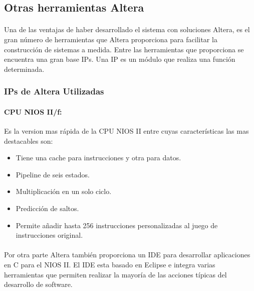 \documentclass[a4paper,12pt,titlepage,final]{book}
\begin{document}
\subsection{Otras herramientas Altera }

\paragraph{}
Una de las ventajas de haber desarrollado el sistema con soluciones Altera, es el gran número de herramientas que Altera proporciona para facilitar la construcción de sistemas a medida. Entre las herramientas que proporciona se encuentra una gran base IPs. Una IP es un módulo que realiza una función determinada.

\subsubsection{IPs de Altera Utilizadas}

\paragraph{CPU NIOS II/f:}
Es la version mas rápida de la CPU NIOS II entre cuyas características las mas destacables son:

\begin{itemize}
\item Tiene una cache para instrucciones y otra para datos.

\item Pipeline de seis estados.

\item Multiplicación en un solo ciclo.

\item Predicción de saltos.

\item Permite añadir hasta 256 instrucciones personalizadas al juego de instrucciones
original.

\end{itemize}

\paragraph{}
Por otra parte Altera también proporciona un IDE para desarrollar aplicaciones en C para el NIOS II. El IDE esta basado en Eclipse e integra varias herramientas que permiten realizar la mayoría de las acciones típicas del desarrollo de software.
\end{document}
